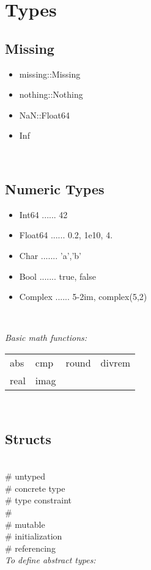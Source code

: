 \section{Types}

\subsection*{Missing}
\begin{itemize}
    \item missing::Missing
    \item nothing::Nothing
    \item NaN::Float64
    \item Inf
\end{itemize} \


\subsection*{Numeric Types}
\begin{itemize}
    \item Int64 ...... 42
    \item Float64 ...... 0.2, 1e10, 4.
    \item Char ....... 'a','b'
    \item Bool ....... true, false
    \item Complex ...... 5-2im, complex(5,2)
\end{itemize} \

\textit{Basic math functions:}\\
\begin{tabular}{l l l l}
    abs & cmp & round & divrem   \\
    real & imag \\
\end{tabular} \

\subsection*{Structs}
  \\
 \# untyped \\
 \# concrete type \\
 \# type constraint \\
 \#  \\
 \# mutable \\
 \# initialization \\
 \# referencing \\
\textit{To define abstract types:}\\
  \\
  \\


